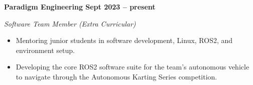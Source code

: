 \vspace{0.1cm}
\textbf{Paradigm Engineering \hfill Sept 2023 -- present} \par
\textit{Software Team Member (Extra Curricular)} \par
\begin{itemize}
    \item Mentoring junior students in software development, Linux, ROS2, and environment setup.
    \item Developing the core ROS2 software suite for the team's autonomous vehicle to navigate through the Autonomous Karting Series competition.
\end{itemize} \par